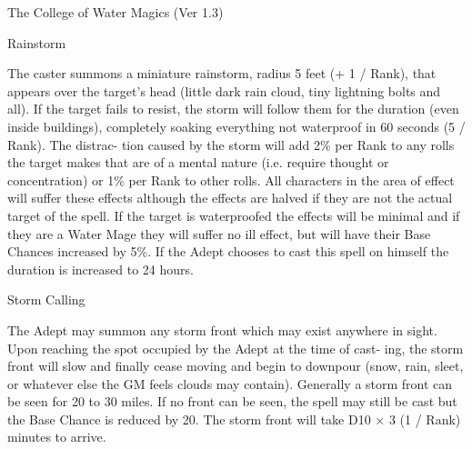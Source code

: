 \begin{Chapter}{The College of Water Magics (Ver 1.3)}
\begin{spell}[S-8]{Rainstorm }

\begin{effects}
The caster summons a miniature rainstorm, 
radius  5  feet  (+  1  /  Rank),  that  appears  over  the 
target’s  head  (little  dark  rain  cloud,  tiny  lightning 
bolts and all). If the target fails to resist, the storm 
will  follow  them  for  the  duration  (even  inside 
buildings),  completely  soaking  everything  not 
waterproof  in  60  seconds  (5  /  Rank).  The  distrac-
tion  caused  by  the  storm will  add 2\%  per Rank  to 
any  rolls  the  target  makes  that  are  of  a  mental 
nature (i.e. require thought or concentration) or 1\% 
per Rank to other rolls. All characters in the area of 
effect  will  suffer  these  effects  although  the  effects 
are  halved  if  they  are  not  the  actual  target  of  the 
spell.  If  the  target  is  waterproofed  the  effects  will 
be minimal and if they are a Water Mage they will 
suffer  no  ill  effect,  but  will  have  their  Base 
Chances increased by 5\%. If the Adept chooses to 
cast this  spell  on  himself  the  duration  is  increased 
to 24 hours. 

\end{effects}
\end{spell}

\begin{spell}[S-9]{Storm Calling }

\begin{effects}
 The  Adept  may  summon  any  storm  front 
which may exist anywhere in sight. Upon reaching 
the spot occupied by the Adept at the time of cast-
ing,  the  storm  front  will  slow  and  finally  cease 
moving  and  begin  to  downpour  (snow,  rain,  sleet, 
or whatever else the GM feels clouds may contain). 
Generally  a  storm  front  can  be  seen  for  20  to  30 
miles. If no front can be seen, the spell may still be 
cast  but  the  Base  Chance  is  reduced  by  20.  The 
storm front will take D10 × 3 (1 / Rank) minutes to 
arrive. 


\end{effects}
\end{spell}


\end{Chapter}
